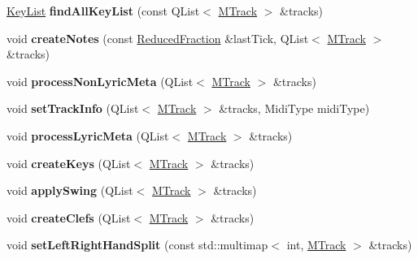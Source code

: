 \begin{DoxyCompactItemize}
\item 
\mbox{\label{namespace_ms_aa5a04421f949585da3c0544f23c3f603}} 
\hyperlink{class_ms_1_1_key_list}{Key\+List} {\bfseries find\+All\+Key\+List} (const Q\+List$<$ \hyperlink{class_ms_1_1_m_track}{M\+Track} $>$ \&tracks)
\item 
\mbox{\label{namespace_ms_a319f409076f7f8ca9a056c0dc5c2dfa6}} 
void {\bfseries create\+Notes} (const \hyperlink{class_ms_1_1_reduced_fraction}{Reduced\+Fraction} \&last\+Tick, Q\+List$<$ \hyperlink{class_ms_1_1_m_track}{M\+Track} $>$ \&tracks)
\item 
\mbox{\label{namespace_ms_a5e0f75f0fad631566507001eed4b6067}} 
void {\bfseries process\+Non\+Lyric\+Meta} (Q\+List$<$ \hyperlink{class_ms_1_1_m_track}{M\+Track} $>$ \&tracks)
\item 
\mbox{\label{namespace_ms_ad5e9132afadcc305fe6a4c303674a789}} 
void {\bfseries set\+Track\+Info} (Q\+List$<$ \hyperlink{class_ms_1_1_m_track}{M\+Track} $>$ \&tracks, Midi\+Type midi\+Type)
\item 
\mbox{\label{namespace_ms_aeb9241b8f2df47a03f4faade1a973ee8}} 
void {\bfseries process\+Lyric\+Meta} (Q\+List$<$ \hyperlink{class_ms_1_1_m_track}{M\+Track} $>$ \&tracks)
\item 
\mbox{\label{namespace_ms_a5f29233f59dc9b7f6790ceefdebc1978}} 
void {\bfseries create\+Keys} (Q\+List$<$ \hyperlink{class_ms_1_1_m_track}{M\+Track} $>$ \&tracks)
\item 
\mbox{\label{namespace_ms_a052e06a515094d17a253917a9f20a5e8}} 
void {\bfseries apply\+Swing} (Q\+List$<$ \hyperlink{class_ms_1_1_m_track}{M\+Track} $>$ \&tracks)
\item 
\mbox{\label{namespace_ms_aab5d3fdada7c1caaea7bcf6e7c86c929}} 
void {\bfseries create\+Clefs} (Q\+List$<$ \hyperlink{class_ms_1_1_m_track}{M\+Track} $>$ \&tracks)
\item 
\mbox{\label{namespace_ms_a769743d74cd37fe130e4f9ce7092810e}} 
void {\bfseries set\+Left\+Right\+Hand\+Split} (const std\+::multimap$<$ int, \hyperlink{class_ms_1_1_m_track}{M\+Track} $>$ \&tracks)

\end{DoxyCompactItemize}
